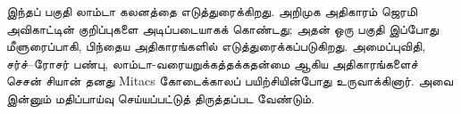 \documentclass[../../include/open-logic-part]{subfiles}
\begin{document}

\begin{editorial}
இந்தப் பகுதி லாம்டா கலனத்தை எடுத்துரைக்கிறது. அறிமுக அதிகாரம் ஜெரமி
அவிகாட்டின் குறிப்புகளை அடிப்படையாகக் கொண்டது; அதன் ஒரு பகுதி இப்போது
மீளுரைப்பாகி, பிந்தைய அதிகாரங்களில் எடுத்துரைக்கப்படுகிறது. அமைப்புவிதி,
சர்ச்--ரோசர் பண்பு, லாம்டா-வரையறுக்கத்தக்கதன்மை ஆகிய அதிகாரங்களைச் செசன்
சியான் தனது Mitacs கோடைக்காலப் பயிற்சியின்போது உருவாக்கினார். அவை இன்னும்
மதிப்பாய்வு செய்யப்பட்டுத் திருத்தப்பட வேண்டும்.
\end{editorial}





\OLEndPartHook
\end{document}
